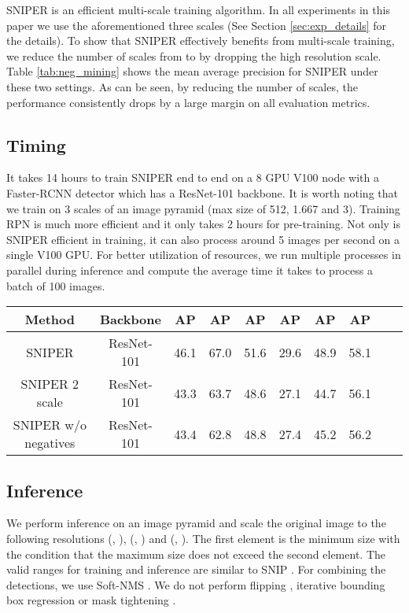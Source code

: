 \documentclass{article}
\begin{document}
SNIPER is an efficient multi-scale training algorithm. In all experiments in this paper we use the aforementioned three scales (See Section \ref{sec:exp_details} for the details). To show that SNIPER effectively benefits from multi-scale training, we reduce the number of scales from  to  by dropping the high resolution scale. Table \ref{tab:neg_mining} shows the mean average precision for SNIPER under these two settings. As can be seen, by reducing the number of scales, the performance consistently drops by a large margin on all evaluation metrics. 

\subsection{Timing}
It takes 14 hours to train SNIPER end to end on a 8 GPU V100 node with a Faster-RCNN detector which has a ResNet-101 backbone. It is worth noting that we train on 3 scales of an image pyramid (max size of 512, 1.667 and 3). Training RPN is much more efficient and it only takes 2 hours for pre-training. Not only is SNIPER efficient in training, it can also process around 5 images per second on a single V100 GPU. For better utilization of resources, we run multiple processes in parallel during inference and compute the average time it takes to process a batch of 100 images.

\begin{table*}[t]
\begin{center}
\small

\begin{tabular}{|c|c|c|c|c|c|c|c|c|c|}
  \hline
  Method & Backbone & AP & AP & AP & AP & AP & AP \\
  \hline
  SNIPER   & ResNet-101 & 46.1 & 67.0 & 51.6 & 29.6 & 48.9 & 58.1 \\
  SNIPER 2 scale   & ResNet-101 & 43.3 & 63.7 & 48.6 & 27.1  & 44.7 & 56.1 \\
  SNIPER w/o negatives  & ResNet-101 & 43.4 & 62.8 & 48.8 & 27.4  & 45.2 & 56.2 \\
  \hline   
 \end{tabular}
 \newline
 \caption{The effect training on 2 scales (1.667 and max size of 512). We also show the impact in performance when no negative mining is performed.}
\label{tab:neg_mining}
\end{center}
\end{table*}



\subsection{Inference}
We perform inference on an image pyramid and scale the original image to the following resolutions (, ), (, ) and (, ). The first element is the minimum size with the condition that the maximum size does not exceed the second element. The valid ranges for training and inference are similar to SNIP \cite{singh2017analysis}. For combining the detections, we use Soft-NMS \cite{bodla2017soft}. We do not perform flipping \cite{zagoruyko2016multipath}, iterative bounding box regression \cite{gidaris2016locnet} or mask tightening \cite{liu2018path}.  
\end{document}
